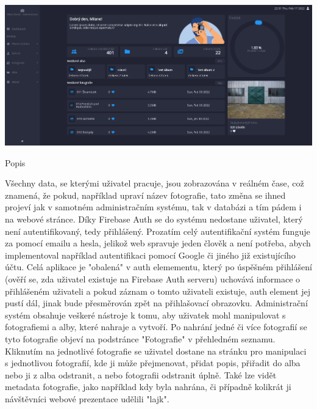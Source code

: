 \documentclass[12pt,a4paper]{report}
\begin{document}
  \vspace*{0.5cm}
  \noindent\includegraphics[width=\linewidth]{admin.png}
  \begin{center}
    Popis
  \end{center}
  \vspace*{0.5cm}

  Všechny data, se kterými uživatel pracuje, jsou zobrazována v reálném čase, což znamená, že
  pokud, například upraví název fotografie, tato změna se ihned projeví jak v samotném
  administračním systému, tak v databázi a tím pádem i na webové stránce.
  Díky Firebase Auth se do systému nedostane uživatel, který není autentifikovaný, tedy přihlášený.
  Prozatím celý autentifikační systém funguje za pomocí emailu a hesla, jelikož web spravuje jeden
  člověk a není potřeba, abych implementoval například autentifikaci pomocí Google či jiného již
  existujícího účtu.
  Celá aplikace je "obalená" v auth elemementu, který po úspěšném přihlášení (ověří se, zda
  uživatel existuje na Firebase Auth serveru) uchovává informace o přihlášeném uživateli a pokud
  záznam o tomto uživateli existuje, auth element jej pustí dál, jinak bude přesměrován zpět na
  přihlašovací obrazovku.
  Administrační systém obsahuje veškeré nástroje k tomu, aby uživatek mohl manipulovat s
  fotografiemi a alby, které nahraje a vytvoří. Po nahrání jedné či více fotografií se tyto fotografie
  objeví na podstránce "Fotografie" v přehledném seznamu. Kliknutím na jednotlivé fotografie se
  uživatel dostane na stránku pro manipulaci s jednotlivou fotografií, kde ji může přejmenovat,
  přidat popis, přiřadit do alba nebo ji z alba odstranit, a nebo fotografii odstranit úplně. Také lze
  vidět metadata fotografie, jako například kdy byla nahrána, či případně kolikrát ji návštěvníci
  webové prezentace udělili "lajk".
\end{document}
